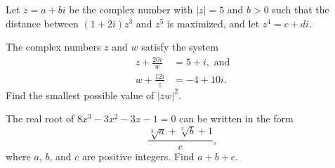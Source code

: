 \begin{question}[name={2012 AIME II, \href{https://artofproblemsolving.com/community/c4p2644130}{Problem 6}}]
	Let $z = a + bi$ be the complex number with $|z| = 5$ and $b > 0$ such that the distance between $(1 + 2i)z^3$ and $z^5$ is maximized, and let $z^4 = c + di$.
\end{question}




%	










\begin{question}[name={2012 AIME II, \href{https://artofproblemsolving.com/community/c4p2644147}{Problem 8}}]
	The complex numbers $z$ and $w$ satisfy the system
	\begin{align*}
		z+\frac{20i}{w}&=5+i, \text{ and}\\w+\frac{12i}{z}&=-4+10i.
	\end{align*}
	Find the smallest possible value of $|zw|^2$.
\end{question}


%	





















\begin{question}[name={2013 AIME I, \href{https://artofproblemsolving.com/community/c4p2969809}{Problem 5}}]
	The real root of $8x^3 - 3x^2 - 3x - 1 = 0$ can be written in the form $$\frac{\sqrt[3]a + \sqrt[3]b + 1}{c},$$ where $a$, $b$, and $c$ are positive integers. Find $a+b+c$.
\end{question}


%	












